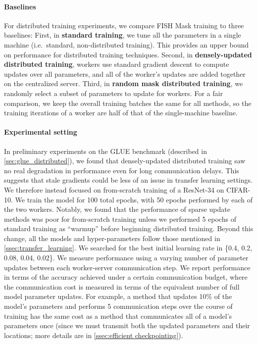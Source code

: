 \paragraph{Baselines}

For distributed training experiments, we compare FISH Mask training to three baselines: First, in \textbf{standard training}, we tune all the parameters in a single machine (i.e.\ standard, non-distributed training). This provides an upper bound on performance for distributed training techniques. Second, in \textbf{densely-updated distributed training}, workers use standard gradient descent to compute updates over all parameters, and all of the worker's updates are added together on the centralized server. Third, in \textbf{random mask distributed training}, we randomly select a subset of parameters to update for workers. For a fair comparison, we keep the overall training batches the same for all methods, so the training iterations of a worker are half of that of the single-machine baseline.

\paragraph{Experimental setting} In preliminary experiments on the GLUE benchmark (described in \ref{sec:glue_distributed}), we found that densely-updated distributed training saw no real degradation in performance even for long communication delays. This suggests that stale gradients could be less of an issue in transfer learning settings. We therefore instead focused on from-scratch training of a ResNet-34 on CIFAR-10. We train the model for 100 total epochs, with 50 epochs performed by each of the two workers. Notably, we found that the performance of sparse update methods was poor for from-scratch training unless we performed 5 epochs of standard training as ``warmup'' before beginning distributed training. Beyond this change, all the models and hyper-parameters follow those mentioned in \ref{ssec:transfer_learning}.
We searched for the best initial learning rate in \{0.4, 0.2, 0.08, 0.04, 0.02\}. 
We measure performance using a varying number of parameter updates between each worker-server communication step. We report performance in terms of the accuracy achieved under a certain communication budget, where the communication cost is measured in terms of the equivalent number of full model parameter updates. For example, a method that updates 10\% of the model's parameters and performs 5 communication steps over the course of training has the same cost as a method that communicates all of a model's parameters once (since we must transmit both the updated parameters and their locations; more details are in \ref{ssec:efficient checkpointing}).

